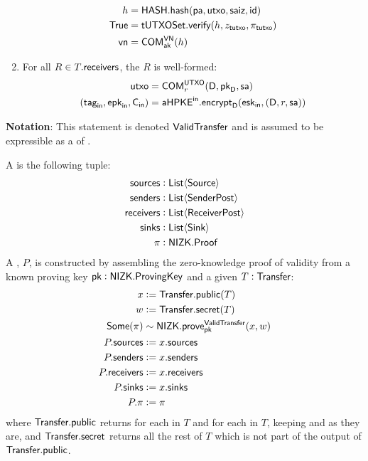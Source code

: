 \begin{definition}
\begin{enumerate}
\begin{align*}
                h                                     &= {\textsf{HASH}}.{\textsf{hash}}({\textsf{pa}}, {\textsf{utxo}}, {\textsf{saiz}}, {\textsf{id}}) \\
                {\textsf{True}}                                 &=  {\textsf{tUTXOSet}}.{\textsf{verify}}(h, z_{\textsf{tutxo}}, \pi_{\textsf{tutxo}})\\
                {\textsf{vn}}                                   &= {\textsf{COM}}^{{\textsf{VN}}}_{{\textsf{ak}}}(h)
            \end{align*}
        \item For all $R \in T.{\textsf{receivers}}$, the \Receiver{} $R$ is well-formed:
            \begin{align*}
                {\textsf{utxo}}            &= {\textsf{COM}}^{{\textsf{UTXO}}}_{r}(\textsf{D}, {{\textsf{pk}}_\textsf{D}}, {\textsf{sa}}) \\
                ({{\textsf{tag}}_\textsf{in}}, {{\textsf{epk}}_\textsf{in}}, {\textsf{C}_\textsf{in}}) &= {{\textsf{aHPKE}}^\textsf{in}}.{\textsf{encrypt}}_\textsf{D}({{\textsf{esk}}_\textsf{in}}, (\textsf{D}, r, {\textsf{sa}}))
            \end{align*}
    \end{enumerate}
    \textbf{Notation}: This statement is denoted ${\textsf{ValidTransfer}}$ and is assumed to be expressible as a \Statement{} of \NIZK{}.
\end{definition}

\begin{definition}
    A \TransferPost{} is the following tuple:
    \begin{align*}
        {\textsf{sources}}    &: {\textsf{List}}\langle{{\textsf{Source}}}\rangle \\
        {\textsf{senders}}    &: {\textsf{List}}\langle{{\textsf{SenderPost}}}\rangle \\
        {\textsf{receivers}}  &: {\textsf{List}}\langle{{\textsf{ReceiverPost}}}\rangle \\
        {\textsf{sinks}}      &: {\textsf{List}}\langle{{\textsf{Sink}}}\rangle \\
        \pi         &: {\textsf{NIZK}}.{\textsf{Proof}} 
    \end{align*}
    A \TransferPost{}, $P$, is constructed by assembling the zero-knowledge proof of \Transfer{} validity from a known proving key ${\textsf{pk}} : {\textsf{NIZK}}.{\textsf{ProvingKey}}$ and a given $T : {\textsf{Transfer}}$:
    \begin{align*}
        x             &:= {\textsf{Transfer}}.{\textsf{public}}(T) \\
        w             &:= {\textsf{Transfer}}.{\textsf{secret}}(T) \\
        {\textsf{Some}}(\pi)    &\sim {\textsf{NIZK}}.{\textsf{prove}}^{\textsf{ValidTransfer}}_{{\textsf{pk}}}(x, w) \\
        P.{\textsf{sources}}    &:= x.{\textsf{sources}} \\
        P.{\textsf{senders}}    &:= x.{\textsf{senders}} \\
        P.{\textsf{receivers}}  &:= x.{\textsf{receivers}} \\
        P.{\textsf{sinks}}      &:= x.{\textsf{sinks}} \\
        P.\pi         &:= \pi
    \end{align*}
    where ${\textsf{Transfer}}.{\textsf{public}}$ returns  for each \Sender{} in $T$ and  for each \Receiver{} in $T$, keeping  and  as they are, and ${\textsf{Transfer}}.{\textsf{secret}}$ returns all the rest of $T$ which is not part of the output of ${\textsf{Transfer}}.{\textsf{public}}$.
\end{definition}

